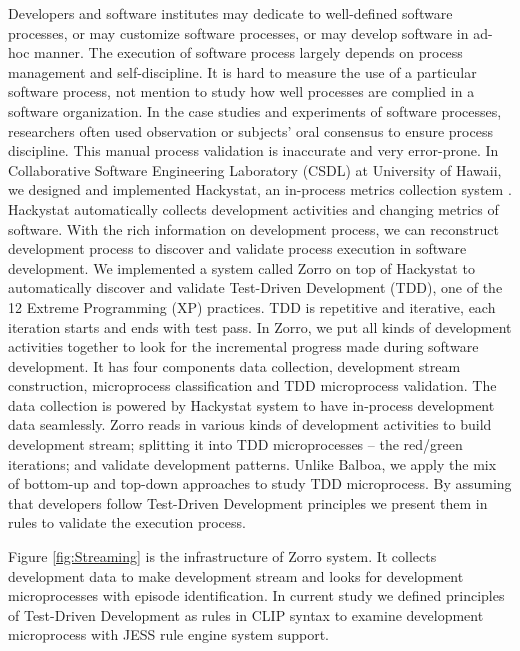 \documentclass[11pt,twocolumn]{article}
\begin{document}
Developers and software institutes may dedicate to well-defined software
processes, or may customize software processes, or may develop software in
ad-hoc manner. The execution of software process largely depends on process
management and self-discipline. It is hard to measure the use of a
particular software process\cite{Janzen:05}, not mention to study how well
processes are complied in a software organization. In the case studies and
experiments of software processes, researchers often used observation or
subjects' oral consensus to ensure process discipline. This manual process
validation is inaccurate and very error-prone. In Collaborative Software
Engineering Laboratory (CSDL) at University of Hawaii, we designed and
implemented Hackystat, an in-process metrics collection system
\cite{csdl2-02-07}. Hackystat automatically collects development activities
and changing metrics of software. With the rich information on development
process, we can reconstruct development process to discover and validate
process execution in software development. We implemented a system called
Zorro on top of Hackystat to automatically discover and validate
Test-Driven Development (TDD), one of the 12 Extreme Programming (XP)
practices. TDD is repetitive and iterative, each iteration starts and ends
with test pass\cite{Beck:03}. In Zorro, we put all kinds of development
activities together to look for the incremental progress made during
software development. It has four components data collection, development
stream construction, microprocess classification and TDD microprocess
validation. The data collection is powered by Hackystat system
\cite{csdl2-02-07} to have in-process development data seamlessly. Zorro
reads in various kinds of development activities to build development
stream; splitting it into TDD microprocesses -- the red/green iterations;
and validate development patterns. Unlike Balboa, we apply the mix of
bottom-up and top-down approaches to study TDD microprocess. By assuming
that developers follow Test-Driven Development principles we present them
in rules to validate the execution process.

Figure \ref{fig:Streaming} is the infrastructure of Zorro system. It
collects development data to make development stream and looks for
development microprocesses with episode identification. In current study we
defined principles of Test-Driven Development as rules in CLIP syntax to
examine development microprocess with JESS rule engine
system\cite{Friedman-Hill:03} support.
\end{document}

